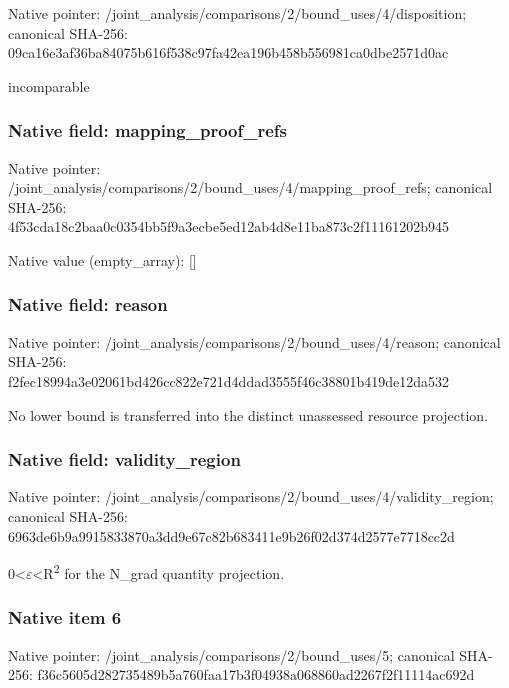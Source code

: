 \documentclass[10pt,a4paper]{article}
\begin{document}
Native pointer: /joint\_analysis/comparis\allowbreak{}ons/2/bound\_uses/4/dispo\allowbreak{}sition; canonical SHA-256: 09ca16e3af36ba84075b616f\allowbreak{}538c97fa42ea196b458b5569\allowbreak{}81ca0dbe2571d0ac


incomparable


\subsubsection{Native field: mapping\_proof\_refs}


Native pointer: /joint\_analysis/comparis\allowbreak{}ons/2/bound\_uses/4/mappi\allowbreak{}ng\_proof\_refs; canonical SHA-256: 4f53cda18c2baa0c0354bb5f\allowbreak{}9a3ecbe5ed12ab4d8e11ba87\allowbreak{}3c2f11161202b945



Native value (empty\_array): []



\subsubsection{Native field: reason}


Native pointer: /joint\_analysis/comparis\allowbreak{}ons/2/bound\_uses/4/reaso\allowbreak{}n; canonical SHA-256: f2fec18994a3e02061bd426c\allowbreak{}c822e721d4ddad3555f46c38\allowbreak{}801b419de12da532


No lower bound is transferred into the distinct unassessed resource projection.


\subsubsection{Native field: validity\_region}


Native pointer: /joint\_analysis/comparis\allowbreak{}ons/2/bound\_uses/4/valid\allowbreak{}ity\_region; canonical SHA-256: 6963de6b9a9915833870a3dd\allowbreak{}9e67c82b683411e9b26f02d3\allowbreak{}74d2577e7718cc2d


0<\ensuremath{\varepsilon}<R\textsuperscript{2} for the N\_grad quantity projection.


\subsubsection{Native item 6}


Native pointer: /joint\_analysis/comparis\allowbreak{}ons/2/bound\_uses/5; canonical SHA-256: f36c5605d282735489b5a760\allowbreak{}faa17b3f04938a068860ad22\allowbreak{}67f2f11114ac692d
\end{document}
